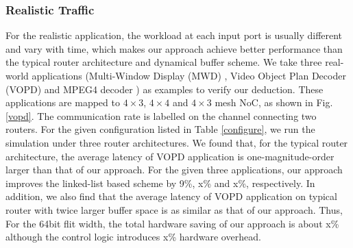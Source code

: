 \documentclass[10pt,conference]{IEEEtran}
\begin{document}
\subsubsection{Realistic Traffic}
For the realistic application, the workload at each input port is usually different and vary with time, which makes our approach achieve better performance than the typical router architecture and dynamical buffer scheme. We take three real-world applications (Multi-Window Display (MWD) \cite{1374853}, Video Object Plan Decoder (VOPD) \cite{Tol2001} and MPEG4 decoder \cite{Tol2001}) as examples to verify our deduction. These applications are mapped to $4\times 3$, $4\times 4$ and $4\times 3$ mesh NoC, as shown in Fig. \ref{vopd}. The communication rate is labelled on the channel connecting two routers. For the given configuration listed in Table \ref{configure}, we run the simulation under three router architectures. We found that, for the typical router architecture, the average latency of VOPD application is one-magnitude-order larger than that of our approach. For the given three applications, our approach improves the linked-list based scheme by 9\%, x\% and x\%, respectively. In addition, we also find that the average latency of VOPD application on typical router with twice larger buffer space is as similar as that of our approach. Thus, For the 64bit flit width, the total hardware saving of our approach is about x\% although the control logic introduces x\% hardware overhead.

\end{document}
